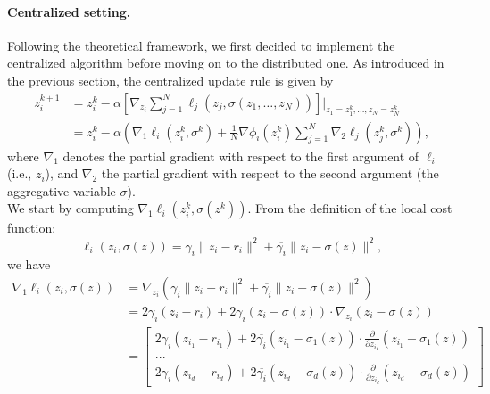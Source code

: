 \medskip

\paragraph{Centralized setting.} Following the theoretical framework, we first decided to implement the centralized algorithm before moving on to the distributed one. As introduced in the previous section, the centralized update rule is given by
\begin{align*}
z_i^{k+1} &= z_i^k - \alpha \left[ \nabla_{z_i} \sum_{j=1}^N \ell_j(z_j, \sigma(z_1, \ldots, z_N)) \right] \Bigg|_{z_1 = z_1^k, \ldots, z_N = z_N^k} \\
          &= z_i^k - \alpha \left( \nabla_1 \ell_i(z_i^k, \sigma^k) + \frac{1}{N} \nabla \phi_i(z_i^k) \sum_{j=1}^N \nabla_2 \ell_j(z_j^k, \sigma^k) \right),
\end{align*}
where \(\nabla_1\) denotes the partial gradient with respect to the first argument of \(\ell_i\) (i.e., \(z_i\)), and \(\nabla_2\) the partial gradient with respect to the second argument (the aggregative variable \(\sigma\)).
\\
We start by computing \(\nabla_1 \ell_i(z_i^k, \sigma(z^k))\). From the definition of the local cost function:
\[
\ell_i(z_i, \sigma(z)) = \gamma_i \| z_i - r_i \|^2 + \overline{\gamma_i} \| z_i - \sigma(z) \|^2,
\]
we have
\begin{align*}
\nabla_1 \ell_i(z_i, \sigma(z)) &= \nabla_{z_i} \left( \gamma_i \| z_i - r_i \|^2 + \overline{\gamma_i} \| z_i - \sigma(z) \|^2 \right) \\ 
&=  2\gamma_i (z_i - r_i) + 2\overline{\gamma_i} (z_i - \sigma(z)) \cdot \nabla_{z_i} (z_i - \sigma(z)) \\
&= \begin{bmatrix}
            2\gamma_i (z_{i_1} - r_{i_1}) + 2\overline{\gamma_i} (z_{i_1} - \sigma_1(z)) \cdot \frac{\partial}{\partial z_{i_1}} (z_{i_1} - \sigma_1(z)) \\
            ... \\
            2\gamma_i (z_{i_d} - r_{i_d}) + 2\overline{\gamma_i} (z_{i_d} - \sigma_d(z)) \cdot \frac{\partial}{\partial z_{i_d}} (z_{i_d} - \sigma_d(z))
            \end{bmatrix}
\end{align*}

